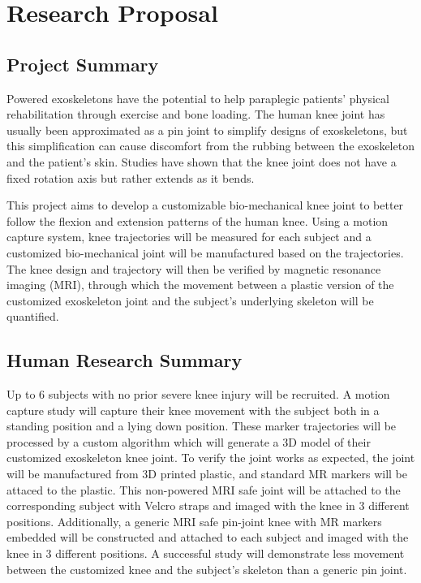 \section{Research Proposal}
\subsection{Project Summary}

Powered exoskeletons have the potential to help paraplegic patients' physical rehabilitation through exercise and bone loading. The human knee joint has usually been approximated as a pin joint to simplify designs of exoskeletons, but this simplification can cause discomfort from the rubbing between the exoskeleton and the patient’s skin. Studies have shown that the knee joint does not have a fixed rotation axis but rather extends as it bends. 

This project aims to develop a customizable bio-mechanical knee joint to better follow the flexion and extension patterns of the human knee. Using a motion capture system, knee trajectories will be measured for each subject and a customized bio-mechanical joint will be manufactured based on the trajectories. The knee design and trajectory will then be verified by magnetic resonance imaging (MRI), through which the movement between a plastic version of the customized exoskeleton joint and the subject’s underlying skeleton will be quantified. 

\subsection{Human Research Summary}

 Up to 6 subjects with no prior severe knee injury will be recruited. A motion capture study will capture their knee movement with the subject both in a standing position and a lying down position. These marker trajectories will be processed by a custom algorithm which will generate a 3D model of their customized exoskeleton knee joint. To verify the joint works as expected, the joint will be manufactured from 3D printed plastic, and standard MR markers will be attaced to the plastic. This non-powered MRI safe joint will be attached to the corresponding subject with Velcro straps and imaged with the knee in 3 different positions. Additionally, a generic MRI safe pin-joint knee with MR markers embedded will be constructed and attached to each subject and imaged with the knee in 3 different positions. A successful study will demonstrate less movement between the customized knee and the subject’s skeleton than a generic pin joint. 


